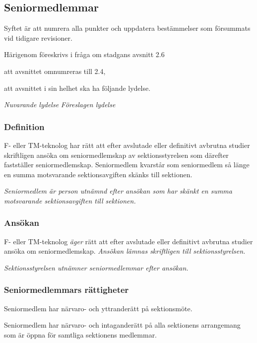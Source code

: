 \documentclass{article}
\newenvironment{lydelse}
    {\begin{paracol}{2}%
        \emph{Nuvarande lydelse}%
        \switchcolumn%
        \emph{Föreslagen lydelse}%
    \end{paracol}%
    \begin{enumerate}[label=\thesubsection.\arabic*]%
    \begin{paracol}{2}%
    }{\end{paracol}\end{enumerate}}
\newcommand{\itemb}{\item[\textbullet]}
\begin{document}
\subsection{Seniormedlemmar}
Syftet är att numrera alla punkter och uppdatera bestämmelser som försummats vid tidigare revisioner.

Härigenom föreskrivs i fråga om stadgans avsnitt 2.6
\begin{dels}
    \item att avsnittet omnumreras till 2.4,
    \item att avsnittet i sin helhet ska ha följande lydelse.
\end{dels}

\begin{lydelse}%
    \subsubsection*{Definition}
    \itemb F- eller TM-teknolog har rätt att efter avslutade eller definitivt avbrutna studier skriftligen ansöka om seniormedlemskap av sektionsstyrelsen som därefter fastställer seniormedlemskap. Seniormedlem kvarstår som senior\-med\-lem så länge en summa motsvarande sektionsavgiften skänks till sektionen.

\switchcolumn
  \setcounter{enumi}{0}
    \item \emph{Seniormedlem är person utnämnd efter ansökan som har skänkt en summa motsvarande sektionsavgiften till sektionen.}
    
    \subsubsection*{Ansökan}
  
    \item F- eller TM-teknolog \emph{äger} rätt att efter avslutade eller definitivt avbrutna studier ansöka om seniormedlemskap.
    \emph{Ansökan lämnas skriftligen till sektionsstyrelsen.}
  
    \item \emph{Sektionsstyrelsen utnämner seniormedlemmar efter ansökan.}
    
\switchcolumn*
    \subsubsection*{Seniormedlemmars rättigheter}%
    \itemb Seniormedlem har närvaro- och yttranderätt på sektionsmöte.

    \itemb Seniormedlem har närvaro- och intaganderätt på alla sektionens arrangemang som är öppna för samtliga sektionens medlemmar.


\end{lydelse}
\end{document}
